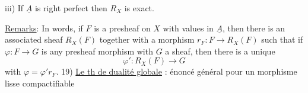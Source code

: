 iii) If $\underline{A}$ is right perfect then $R_X$ is exact.

\uline{Remarks}: In  words, if $F$ is a presheaf on $X$ with values in $\underline{A}$, then there is an associated sheaf $R_X(F)$ together with a morphism $r_F:F\longrightarrow R_X(F)$ such that if $\varphi:F\longrightarrow G$ is any presheaf morphism with $G$ a sheaf, then there is a unique
\[
\varphi':R_X(F)\longrightarrow G
\]
with $\varphi=\varphi'r_F$.
\deleted{\unsure{\S}} 19) \uline{Le th de dualité globale} : énoncé
général pour un morphisme lisse compactifiable
